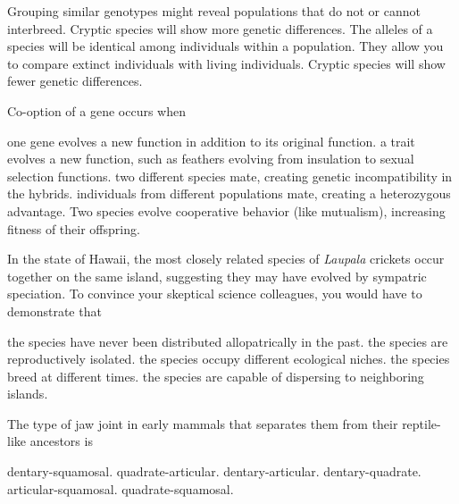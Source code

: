 \begin{choices}
\correctchoice Grouping similar genotypes might reveal populations that do not or cannot interbreed. %
\choice Cryptic species will show more genetic differences. %
\choice The alleles of a species will be identical among individuals within a population. %
\choice They allow you to compare extinct individuals with living individuals. %
\choice Cryptic species will show fewer genetic differences. %
\end{choices}


\question
Co-option of a gene occurs when

\begin{choices}
\correctchoice one gene evolves a new function in addition to its original function. %
\choice a trait evolves a new function, such as feathers evolving from insulation to sexual selection functions. %
\choice two different species mate, creating genetic incompatibility in the hybrids. %
\choice individuals from different populations mate, creating a heterozygous advantage. %
\choice Two species evolve cooperative behavior (like mutualism), increasing fitness of their offspring. %
\end{choices}


\question
In the state of Hawaii, the most closely related species of \textit{Laupala} crickets occur together on the same island, suggesting they may have evolved by sympatric speciation.  To convince your skeptical science colleagues, you would have to demonstrate that

\begin{choices}
\correctchoice the species have never been distributed allopatrically in the past. %
\choice the species are reproductively isolated. %
\choice the species occupy different ecological niches. %
\choice the species breed at different times. %
\choice the species are capable of dispersing to neighboring islands. %
\end{choices}


\question
The type of jaw joint in early mammals that separates them from their reptile-like ancestors is 
\begin{choices}
\correctchoice dentary-squamosal. %
\choice quadrate-articular. %
\choice dentary-articular. %
\choice dentary-quadrate. %
\choice articular-squamosal. %
\choice quadrate-squamosal. %
\end{choices}


